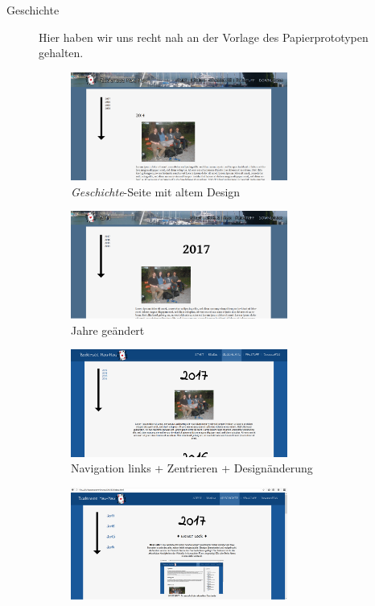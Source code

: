 \documentclass{scrartcl}
\begin{document}
\begin{enumerate}
\begin{description}
\item[Geschichte] Hier haben wir uns recht nah an der Vorlage des Papierprototypen gehalten. \\
\begin{figure}[H]
 \centering
   \includegraphics[width=0.7\textwidth]{geschichte.png}
\caption{\textit{Geschichte}-Seite mit altem Design}
\end{figure}
\begin{figure}[H]
 \centering
   \includegraphics[width=0.7\textwidth]{geschichte2.png}
\caption{Jahre geändert}
\end{figure}
\begin{figure}[H]
 \centering
   \includegraphics[width=0.7\textwidth]{geschichte3.png}
\caption{Navigation links + Zentrieren + Designänderung}
\end{figure}
\begin{figure}[H]
 \centering
   \includegraphics[width=0.7\textwidth]{geschichte4.png}

\end{figure}
\end{description}
\end{enumerate}
\end{document}
